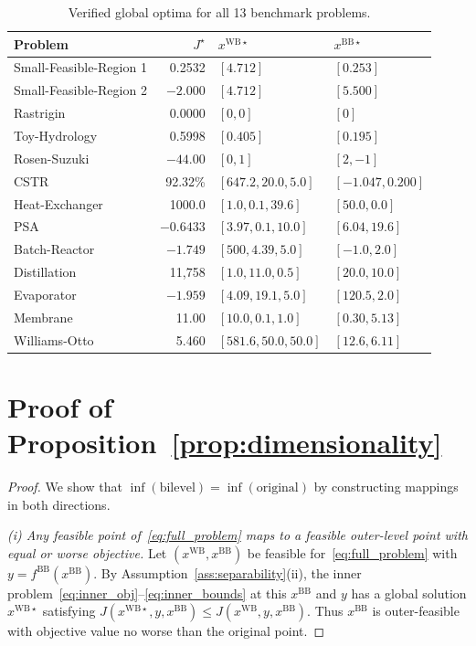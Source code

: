 \documentclass[12pt,a4paper]{article}%
\theoremstyle{plain}%
\theoremstyle{remark}%
\theoremstyle{definition}%
\def\WB{\mathrm{WB}}
\def\BB{\mathrm{BB}}
\begin{document}
\begin{appendices}
\begin{table}[htbp]
\centering
\caption{Verified global optima for all 13 benchmark problems.}
\label{tab:verified_optima}
\begin{tabular}{@{}lrll@{}}
\toprule
\textbf{Problem} & $J^\star$ & $x^{\WB\star}$ & $x^{\BB\star}$ \\
\midrule
Small-Feasible-Region 1 & 0.2532 & $[4.712]$ & $[0.253]$ \\
Small-Feasible-Region 2 & $-2.000$ & $[4.712]$ & $[5.500]$ \\
Rastrigin & 0.0000 & $[0, 0]$ & $[0]$ \\
Toy-Hydrology & 0.5998 & $[0.405]$ & $[0.195]$ \\
Rosen-Suzuki & $-44.00$ & $[0, 1]$ & $[2, -1]$ \\
\midrule
CSTR & 92.32\% & $[647.2, 20.0, 5.0]$ & $[-1.047, 0.200]$ \\
Heat-Exchanger & 1000.0 & $[1.0, 0.1, 39.6]$ & $[50.0, 0.0]$ \\
PSA & $-0.6433$ & $[3.97, 0.1, 10.0]$ & $[6.04, 19.6]$ \\
Batch-Reactor & $-1.749$ & $[500, 4.39, 5.0]$ & $[-1.0, 2.0]$ \\
Distillation & 11{,}758 & $[1.0, 11.0, 0.5]$ & $[20.0, 10.0]$ \\
Evaporator & $-1.959$ & $[4.09, 19.1, 5.0]$ & $[120.5, 2.0]$ \\
Membrane & 11.00 & $[10.0, 0.1, 1.0]$ & $[0.30, 5.13]$ \\
Williams-Otto & 5.460 & $[581.6, 50.0, 50.0]$ & $[12.6, 6.11]$ \\
\bottomrule
\end{tabular}
\end{table}

\section{Proof of Proposition~\ref{prop:dimensionality}}\label{sec:proof_dimensionality}

\begin{proof}
We show that $\inf(\text{bilevel}) = \inf(\text{original})$ by constructing mappings in both directions.

\emph{(i) Any feasible point of~\eqref{eq:full_problem} maps to a feasible outer-level point with equal or worse objective.}
Let $(x^{\WB}, x^{\BB})$ be feasible for~\eqref{eq:full_problem} with $y = f^{\BB}(x^{\BB})$. By Assumption~\ref{ass:separability}(ii), the inner problem~\eqref{eq:inner_obj}--\eqref{eq:inner_bounds} at this $x^{\BB}$ and $y$ has a global solution $x^{\WB\star}$ satisfying $J(x^{\WB\star}, y, x^{\BB}) \leq J(x^{\WB}, y, x^{\BB})$. Thus $x^{\BB}$ is outer-feasible with objective value no worse than the original point.


\end{proof}
\end{appendices}
\end{document}
